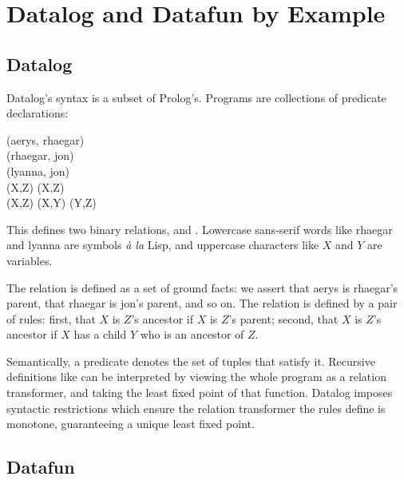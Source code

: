 \section{Datalog and Datafun by Example}
\label{sec:datalog-and-datafun}

\subsection{Datalog}

Datalog's syntax is a subset of Prolog's. Programs are collections of predicate
declarations:

\newcommand\datum[1]{\textsf{#1}}

\begin{code}
  (\datum{aerys}, \datum{rhaegar})\\
  (\datum{rhaegar}, \datum{jon})\\
  (\datum{lyanna}, \datum{jon})\hspace{30em}
  \\[6pt]
  (X,Z) \gets {}(X,Z)\\
  (X,Z) \gets {}(X,Y) \wedge {}(Y,Z)
\end{code}

\noindent
This defines two binary relations,  and . Lowercase
sans-serif words like \datum{rhaegar} and \datum{lyanna} are symbols \emph{\`a
  la} Lisp, and uppercase characters like $X$ and $Y$ are variables.

The  relation is defined as a set of ground facts: we assert that
\datum{aerys} is \datum{rhaegar}'s parent, that \datum{rhaegar} is \datum{jon}'s
parent, and so on. The  relation is defined by a pair of rules:
first, that $X$ is $Z$'s ancestor if $X$ is $Z$'s parent; second, that $X$ is
$Z$'s ancestor if $X$ has a child $Y$ who is an ancestor of $Z$.

Semantically, a predicate denotes the set of tuples that satisfy it. Recursive
definitions like  can be interpreted by viewing the whole program
as a relation transformer, and taking the least fixed point of that function.
Datalog imposes syntactic restrictions which ensure the relation transformer the
rules define is monotone, guaranteeing a unique least fixed point.

\subsection{Datafun}

